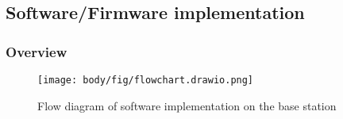 


%
%
%
%


\pagebreak
\subsection{Software/Firmware implementation}
\subsubsection{Overview}

\begin{figure}[!htb]
	\centering
	\texttt{[image: body/fig/flowchart.drawio.png]}
	\caption{Flow diagram of software implementation on the base station}
	\label{fig:softwareoverview}
\end{figure}

